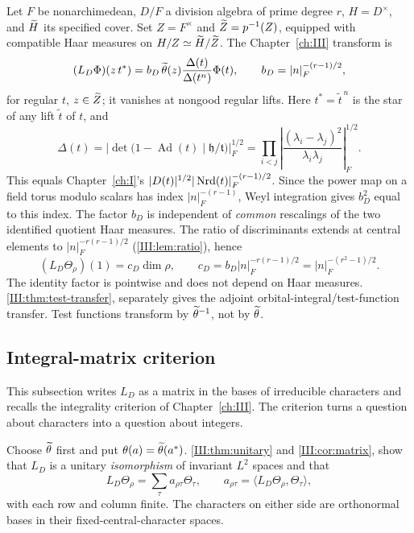 Let $F$ be nonarchimedean, $D/F$ a division algebra of prime
degree $r$, $H=D^\times$, and $\widetilde H$ its specified cover.
Set $Z=F^\times$ and $\widetilde Z=p^{-1}(Z)$, equipped with compatible
Haar measures on $H/Z\simeq\widetilde H/\widetilde Z$.  The Chapter~\ref{ch:III} transform is
\begin{equation}\label{W:eq:LD}
 (L_D\Phi)(z\,t^*)
 =b_D\,\widetilde\theta(z)
  \frac{\Delta(t)}{\Delta(t^n)}\Phi(t),\qquad
 b_D=|n|_F^{-(r-1)/2},
\end{equation}
for regular $t$, $z\in\widetilde Z$; it vanishes at nongood regular lifts.
Here $t^*=\tilde t^{\,n}$ is the star of any lift $\tilde t$ of $t$, and
\begin{equation}\label{W:eq:Delta}
 \Delta(t)=\left|\det\bigl(1-\operatorname{Ad}(t)
 \mid\mathfrak h/\mathfrak t\bigr)\right|_F^{1/2}
 =\prod_{i<j}\left|
 \frac{(\lambda_i-\lambda_j)^2}{\lambda_i\lambda_j}
 \right|_F^{1/2}.
\end{equation}
This equals Chapter~\ref{ch:I}'s $|D(t)|^{1/2}|\operatorname{Nrd}(t)|_F^{-(r-1)/2}$.
Since the power map on a field torus modulo scalars has index
$|n|_F^{-(r-1)}$, Weyl integration gives $b_D^2$
equal to this index.  The factor $b_D$ is independent of
\emph{common} rescalings of the two identified quotient Haar
measures.  The ratio of discriminants extends at central elements
to $|n|_F^{-r(r-1)/2}$ (\cref{III:lem:ratio}), hence
\begin{equation}\label{W:eq:cD}
 (L_D\Theta_\rho)(1)=c_D\dim\rho,\qquad
 c_D=b_D|n|_F^{-r(r-1)/2}
 =|n|_F^{-(r^2-1)/2}.
\end{equation}
The identity factor is pointwise and does not depend on Haar
measures.  \cref{III:thm:test-transfer}, separately gives the adjoint
orbital-integral/test-function transfer.  Test functions transform
by $\widetilde\theta^{-1}$, not by $\widetilde\theta$.

\subsection{Integral-matrix criterion}\label{W:subsec:integral}
This subsection writes $L_D$ as a matrix in the bases of irreducible characters and recalls the integrality criterion of Chapter~\ref{ch:III}. The criterion turns a question about characters into a question about integers.

Choose $\widetilde\theta$ first and put
$\theta(a)=\widetilde\theta(a^*)$.
\cref{III:thm:unitary} and \cref{III:cor:matrix}, show that $L_D$ is a
unitary \emph{isomorphism} of invariant $L^2$ spaces and that
\begin{equation}\label{W:eq:matrixchars}
 L_D\Theta_\rho=\sum_\tau a_{\rho\tau}\Theta_\tau,
 \qquad a_{\rho\tau}=\langle L_D\Theta_\rho,
 \Theta_\tau\rangle,
\end{equation}
with each row and column finite.  The characters on either side
are orthonormal bases in their fixed-central-character spaces.


